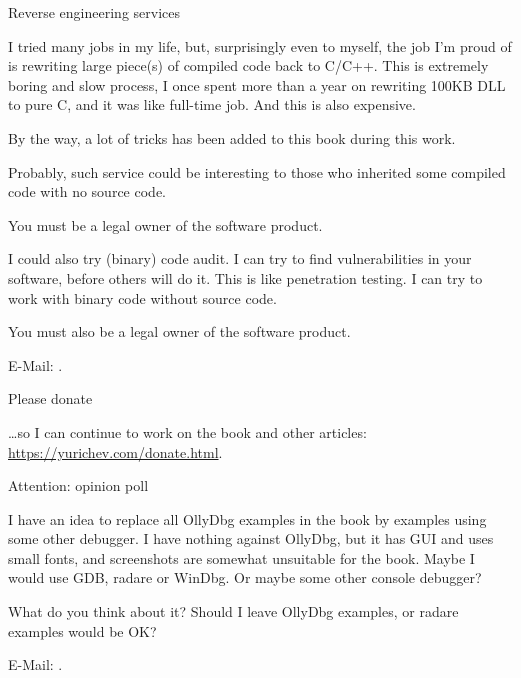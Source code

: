 \vspace*{\fill}

\huge Reverse engineering services
\normalsize

\bigskip
\bigskip
\bigskip

I tried many jobs in my life, but, surprisingly even to myself,
the job I'm proud of is rewriting large piece(s) of compiled code back to C/C++.
This is extremely boring and slow process, I once spent more than a year on rewriting 100KB DLL to pure C,
and it was like full-time job.
And this is also expensive.

By the way, a lot of tricks has been added to this book during this work.

Probably, such service could be interesting to those who inherited some compiled code with no source code.

You must be a legal owner of the software product.

\bigskip

I could also try (binary) code audit.
I can try to find vulnerabilities in your software, before others will do it.
This is like penetration testing.
I can try to work with binary code without source code.

You must also be a legal owner of the software product.

E-Mail: \GTT{\EMAIL}.

\bigskip
\bigskip
\bigskip

\huge Please donate
\normalsize

\bigskip
\bigskip
\bigskip

\dots so I can continue to work on the book and other articles: \\
\url{https://yurichev.com/donate.html}.

\bigskip
\bigskip
\bigskip

\huge Attention: opinion poll
\normalsize

\bigskip
\bigskip
\bigskip

I have an idea to replace all OllyDbg examples in the book by examples using some other debugger.
I have nothing against OllyDbg, but it has GUI and uses small fonts, and screenshots are somewhat unsuitable for the book.
Maybe I would use GDB, radare or WinDbg.
Or maybe some other console debugger?

What do you think about it?
Should I leave OllyDbg examples, or radare examples would be OK?

E-Mail: \GTT{\EMAIL}.

\vspace*{\fill}
\vfill
